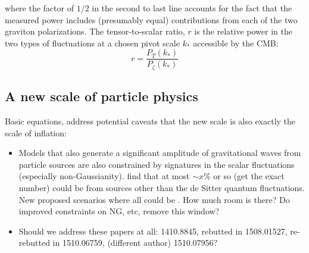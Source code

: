 where the factor of $1/2$ in the second to last line accounts for the fact that the measured power includes (presumably equal) contributions from each of the two graviton polarizations. 
The tensor-to-scalar ratio, $r$ is the relative power in the two types of fluctuations at a chosen pivot scale $k_*$ accessible by the CMB:
\begin{equation}
r=\frac{P_T(k_*)}{P_{\zeta}(k_*)}
\end{equation}
 

\subsection{A new scale of particle physics}
Basic equations, address potential caveats that the new scale is also exactly the scale of inflation:



\begin{itemize}
\item Models that also generate a significant amplitude of gravitational waves from particle sources are also constrained by signatures in the scalar fluctuations (especially non-Gaussianity). \cite{Mirbabayi:2014jqa, Ozsoy:2014sba} find that at most $\sim x\%$ or so (get the exact number) could be from sources other than the de Sitter quantum fluctuations. New proposed scenarios where all could be  \cite{Namba:2015gja}. How much room is there? Do improved constraints on NG, etc, remove this window?
\item Should we address these papers at all: 1410.8845, rebutted in 1508.01527, re-rebutted in 1510.06759, (different author) 1510.07956?
\end{itemize}


